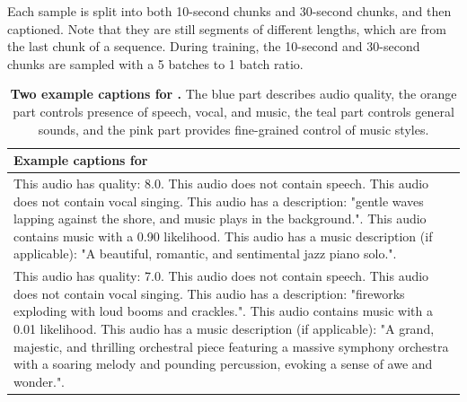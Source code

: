 Each sample is split into both 10-second chunks and 30-second chunks, and then captioned.
Note that they are still segments of different lengths, which are from the last chunk of a sequence.
During training, the 10-second and 30-second chunks are sampled with a 5 batches to 1 batch ratio.

\begin{table}[H]
    \centering
    \begin{tabular}{p{15cm}}
    \toprule
    \textbf{Example captions for \mvga{}} \\
    \midrule
    \textcolor{capblue}{This audio has quality: 8.0}.
    \textcolor{capyellow}{This audio does not contain speech. This audio does not contain vocal singing.}
    \textcolor{capteal}{This audio has a description: "gentle waves lapping against the shore, and music plays in the background.".}
    \textcolor{capyellow}{This audio contains music with a 0.90 likelihood.}
    \textcolor{cappink}{This audio has a music description (if applicable): "A beautiful, romantic, and sentimental jazz piano solo.".} \\ \midrule
    \textcolor{capblue}{This audio has quality: 7.0}.
    \textcolor{capyellow}{This audio does not contain speech. This audio does not contain vocal singing.}
    \textcolor{capteal}{This audio has a description: "fireworks exploding with loud booms and crackles.".}
    \textcolor{capyellow}{This audio contains music with a 0.01 likelihood.}
    \textcolor{cappink}{This audio has a music description (if applicable): "A grand, majestic, and thrilling orchestral piece featuring a massive symphony orchestra with a soaring melody and pounding percussion, evoking a sense of awe and wonder.".}
    \\
    \bottomrule
    \end{tabular}
    \caption{\textbf{Two example captions for \mvga{}.} The blue part describes audio quality, the orange part controls presence of speech, vocal, and music, the teal part controls general sounds, and the pink part provides fine-grained control of music styles.}
    \label{tab:audio_caption}
\end{table}
